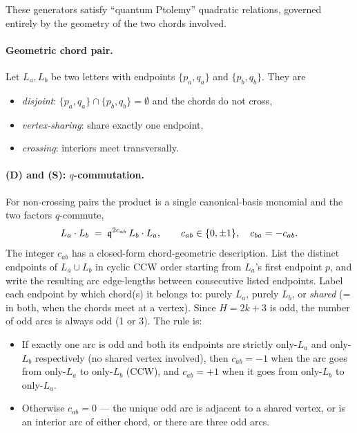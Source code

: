 \documentclass[12pt]{amsart}
\begin{document}
These generators satisfy ``quantum Ptolemy'' quadratic relations,
governed entirely by the geometry of the two chords involved.

\paragraph{Geometric chord pair.} Let $L_a, L_b$ be two letters with
endpoints $\{p_a, q_a\}$ and $\{p_b, q_b\}$. They are
\begin{itemize}
  \item[(D)] \emph{disjoint}: $\{p_a, q_a\} \cap \{p_b, q_b\} = \emptyset$
    and the chords do not cross,
  \item[(S)] \emph{vertex-sharing}: share exactly one endpoint,
  \item[(X)] \emph{crossing}: interiors meet transversally.
\end{itemize}

\paragraph{(D) and (S): $q$-commutation.}
For non-crossing pairs the product is a single canonical-basis monomial
and the two factors $q$-commute,
\begin{equation}
  L_a \cdot L_b \;=\; \mathfrak{q}^{2c_{ab}}\, L_b \cdot L_a,
  \qquad c_{ab} \in \{0, \pm 1\}, \quad c_{ba} = -c_{ab}.
\end{equation}
The integer $c_{ab}$ has a closed-form chord-geometric description.
List the distinct endpoints of $L_a \cup L_b$ in cyclic CCW order
starting from $L_a$'s first endpoint $p$, and write the resulting
arc edge-lengths between consecutive listed endpoints. Label each
endpoint by which chord(s) it belongs to: purely $L_a$, purely $L_b$,
or \emph{shared} (= in both, when the chords meet at a vertex).
Since $H = 2k+3$ is odd, the number of odd arcs is always odd (1 or 3).
The rule is:
\begin{itemize}
  \item If exactly one arc is odd and both its endpoints are strictly
    only-$L_a$ and only-$L_b$ respectively (no shared vertex involved),
    then $c_{ab} = -1$ when the arc goes from only-$L_a$ to only-$L_b$
    (CCW), and $c_{ab} = +1$ when it goes from only-$L_b$ to only-$L_a$.
  \item Otherwise $c_{ab} = 0$ — the unique odd arc is adjacent to a
    shared vertex, or is an interior arc of either chord, or there are
    three odd arcs.
\end{itemize}
\end{document}
